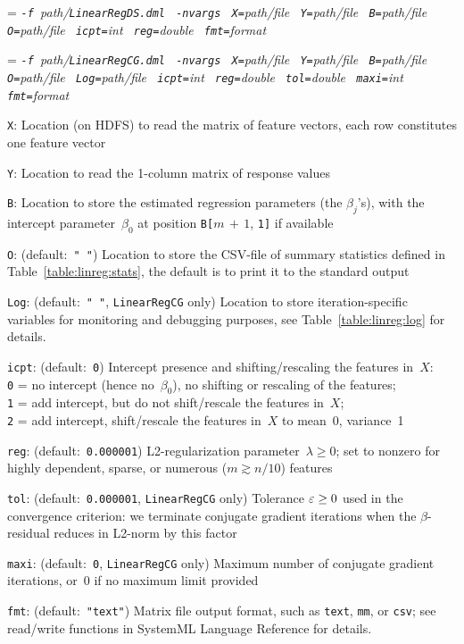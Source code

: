 \smallskip
{}
\smallskip

{\hangindent=\parindent\noindent\it%
{\tt{}-f }path/\/{\tt{}LinearRegDS.dml}
{\tt{} -nvargs}
{\tt{} X=}path/file
{\tt{} Y=}path/file
{\tt{} B=}path/file
{\tt{} O=}path/file
{\tt{} icpt=}int
{\tt{} reg=}double
{\tt{} fmt=}format

}\smallskip
{\hangindent=\parindent\noindent\it%
{\tt{}-f }path/\/{\tt{}LinearRegCG.dml}
{\tt{} -nvargs}
{\tt{} X=}path/file
{\tt{} Y=}path/file
{\tt{} B=}path/file
{\tt{} O=}path/file
{\tt{} Log=}path/file
{\tt{} icpt=}int
{\tt{} reg=}double
{\tt{} tol=}double
{\tt{} maxi=}int
{\tt{} fmt=}format

}

\smallskip
{}
\begin{Description}
\item[{\tt X}:]
Location (on HDFS) to read the matrix of feature vectors, each row constitutes
one feature vector
\item[{\tt Y}:]
Location to read the 1-column matrix of response values
\item[{\tt B}:]
Location to store the estimated regression parameters (the $\beta_j$'s), with the
intercept parameter~$\beta_0$ at position {\tt B[}$m\,{+}\,1$, {\tt 1]} if available
\item[{\tt O}:] (default:\mbox{ }{\tt " "})
Location to store the CSV-file of summary statistics defined in
Table~\ref{table:linreg:stats}, the default is to print it to the standard output
\item[{\tt Log}:] (default:\mbox{ }{\tt " "}, {\tt LinearRegCG} only)
Location to store iteration-specific variables for monitoring and debugging purposes,
see Table~\ref{table:linreg:log} for details.
\item[{\tt icpt}:] (default:\mbox{ }{\tt 0})
Intercept presence and shifting/rescaling the features in~$X$:\\
{\tt 0} = no intercept (hence no~$\beta_0$), no shifting or rescaling of the features;\\
{\tt 1} = add intercept, but do not shift/rescale the features in~$X$;\\
{\tt 2} = add intercept, shift/rescale the features in~$X$ to mean~0, variance~1
\item[{\tt reg}:] (default:\mbox{ }{\tt 0.000001})
L2-regularization parameter~\mbox{$\lambda\geq 0$}; set to nonzero for highly dependent,
sparse, or numerous ($m \gtrsim n/10$) features
\item[{\tt tol}:] (default:\mbox{ }{\tt 0.000001}, {\tt LinearRegCG} only)
Tolerance \mbox{$\varepsilon\geq 0$} used in the convergence criterion: we terminate conjugate
gradient iterations when the $\beta$-residual reduces in L2-norm by this factor
\item[{\tt maxi}:] (default:\mbox{ }{\tt 0}, {\tt LinearRegCG} only)
Maximum number of conjugate gradient iterations, or~0 if no maximum
limit provided
\item[{\tt fmt}:] (default:\mbox{ }{\tt "text"})
Matrix file output format, such as {\tt text}, {\tt mm}, or {\tt csv};
see read/write functions in SystemML Language Reference for details.
\end{Description}


